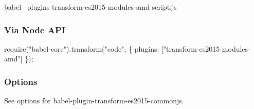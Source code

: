 \begin{DoxyCode}
babel --plugins transform-es2015-modules-amd script.js
\end{DoxyCode}


\subsubsection*{Via Node A\+PI}


\begin{DoxyCode}
require("babel-core").transform("code", \{
  plugins: ["transform-es2015-modules-amd"]
\});
\end{DoxyCode}


\subsubsection*{Options}

See options for {\ttfamily babel-\/plugin-\/transform-\/es2015-\/commonjs}. 